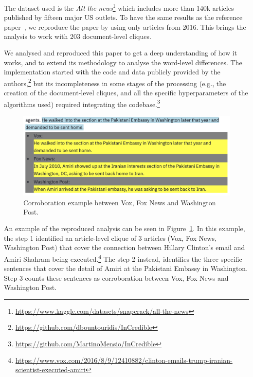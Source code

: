 The dataset used is the \emph{All-the-news}\footnote{\url{https://www.kaggle.com/datasets/snapcrack/all-the-news}} which includes more than 140k articles published by fifteen major US outlets. To have the same results as the reference paper~\citep{bountouridis2018explaining}, we reproduce the paper by using only articles from 2016. This brings the analysis to work with 203 document-level cliques. 

We analysed and reproduced this paper to get a deep understanding of how it works, and to extend its methodology to analyse the word-level differences. %
The implementation started with the code and data %
publicly provided by the authors,\footnote{\url{https://github.com/dbountouridis/InCredible}} but its incompleteness in some stages of the processing (e.g., the creation of the document-level cliques, and all the specific hyperparameters of the algorithms used) required integrating the codebase.\footnote{\url{https://github.com/MartinoMensio/InCredible}}

\begin{figure}[!htbp]
    \centering
    \includegraphics[width=\linewidth]{figures/cluster_similar_sentences_amiri.png}
    \caption{Corroboration example between Vox, Fox News and Washington Post.}
    \label{fig:cluster_similar_sentences_amiri}
\end{figure}%

An example of the reproduced analysis can be seen in Figure~\ref{fig:cluster_similar_sentences_amiri}.
In this example, the step 1 identified an article-level clique of 3 articles (Vox, Fox News, Washington Post) that cover the connection between Hillary Clinton's email and Amiri Shahram being executed.\footnote{\url{https://www.vox.com/2016/8/9/12410882/clinton-emails-trump-iranian-scientist-executed-amiri}}
The step 2 instead, identifies the three specific sentences that cover the detail of Amiri at the Pakistani Embassy in Washington.
Step 3 counts these sentences as corroboration between Vox, Fox News and Washington Post. 

